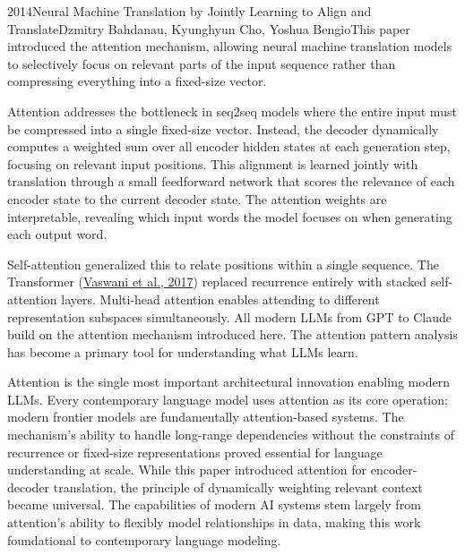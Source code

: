 
\begin{papersummary}{2014}{Neural Machine Translation by Jointly Learning to Align and Translate}{Dzmitry Bahdanau, Kyunghyun Cho, Yoshua Bengio}{This paper introduced the attention mechanism, allowing neural machine translation models to selectively focus on relevant parts of the input sequence rather than compressing everything into a fixed-size vector.}

Attention addresses the bottleneck in seq2seq models where the entire input must be compressed into a single fixed-size vector. Instead, the decoder dynamically computes a weighted sum over all encoder hidden states at each generation step, focusing on relevant input positions. This alignment is learned jointly with translation through a small feedforward network that scores the relevance of each encoder state to the current decoder state. The attention weights are interpretable, revealing which input words the model focuses on when generating each output word.

Self-attention generalized this to relate positions within a single sequence. The Transformer (\hyperref[paper:vaswani-2017]{Vaswani et al., 2017}) replaced recurrence entirely with stacked self-attention layers. Multi-head attention enables attending to different representation subspaces simultaneously. All modern LLMs from GPT to Claude build on the attention mechanism introduced here. The attention pattern analysis has become a primary tool for understanding what LLMs learn.

Attention is the single most important architectural innovation enabling modern LLMs. Every contemporary language model uses attention as its core operation; modern frontier models are fundamentally attention-based systems. The mechanism's ability to handle long-range dependencies without the constraints of recurrence or fixed-size representations proved essential for language understanding at scale. While this paper introduced attention for encoder-decoder translation, the principle of dynamically weighting relevant context became universal. The capabilities of modern AI systems stem largely from attention's ability to flexibly model relationships in data, making this work foundational to contemporary language modeling.

\end{papersummary}
